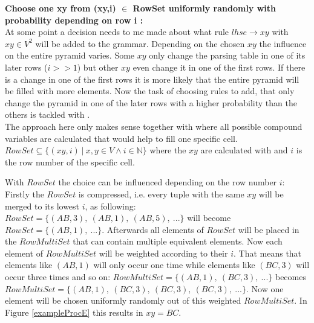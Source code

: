 \noindent \textbf{Choose one xy from (xy,i) $\in$ RowSet uniformly randomly with probability depending on row i  :}\\
At some point a decision needs to me made about what rule $lhse\rightarrow xy$ with $xy \in V^2$ will be added to the grammar. Depending on the chosen $xy$ the influence on the entire pyramid varies. Some $xy$ only change the parsing table in one of its later rows ($i>>1$) but other $xy$ even change it in one of the first rows. If there is a change in one of the first rows it is more likely that the entire pyramid will be filled with more elements. Now the task of choosing rules to add, that only change the pyramid in one of the later rows with a higher probability than the others is tackled with . \\
The approach here only makes sense together with  where all possible compound variables are calculated that would help to fill one specific cell. $RowSet \subseteq \{(xy,i)\ |\ x,y \in V \wedge i \in \mathbb{N} \}$ where the $xy$ are calculated with  and $i$ is the row number of the specific cell. \pagebreak \clearpage

\begin{testexample}
	With $RowSet$ the choice can be influenced depending on the row number $i$: Firstly the $RowSet$ is compressed, i.e. every tuple with the same $xy$ will be merged to its lowest $i$, as following: $RowSet = \{(AB,3),~(AB,1),~(AB,5),~... \}$ will become $RowSet = \{(AB,1),~... \}$. Afterwards all elements of $RowSet$ will be placed in the $RowMultiSet$ that  can contain multiple equivalent elements. Now each element of $RowMultiSet$ will be weighted according to their $i$. That means that elements like $(AB,1)$ will only occur one time while elements like $(BC,3)$ will occur three times and so on: $RowMultiSet = \{(AB,1),~(BC,3),~...\}$ becomes $RowMultiSet = \{(AB,1),~(BC,3),~(BC,3),~(BC,3),~...\}$. Now one element will be chosen uniformly randomly out of this weighted $RowMultiSet$. In Figure \ref{exampleProcE} this results in $xy = BC$.\\
	
	\begin{adjustbox}{max width=\textwidth}	
	\begin{minipage}{6in}
		\centering
	\end{minipage}
	\end{adjustbox}
	\label{exampleProcE}
	
\end{testexample}

